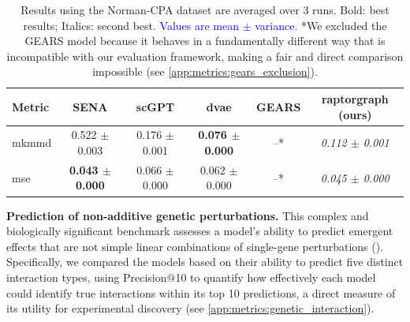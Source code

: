 \documentclass{article}
\begin{document}
\begin{table}[H]
    \centering
    \begin{tabular}{lccccc}
        \toprule
        {Metric} & {SENA} & {scGPT} & {\gls{dvae}} & {GEARS} & {\gls{raptorgraph}} (ours) \\
        \midrule
        \gls{mkmmd} & 0.522 $\pm$ 0.003 & 0.176 $\pm$ 0.001 & \textbf{0.076 $\pm$ 0.000} & {--}* & \textit{0.112 $\pm$ 0.001} \\
        \gls{mse} & \textbf{0.043 $\pm$ 0.000} & 0.066 $\pm$ 0.000 & 0.062 $\pm$ 0.000 & {--}* & \textit{0.045 $\pm$ 0.000} \\
        \bottomrule
    \end{tabular}
    \caption{Results using the Norman-CPA dataset are averaged over $3$ runs. Bold: best results; Italics: second best. \textcolor{blue}{Values are mean $\pm$ variance.}
    *We excluded the GEARS model because it behaves in a fundamentally different way that is incompatible with our evaluation framework, making a fair and direct comparison impossible (see \cref{app:metrics:gears_exclusion}).}
    \label{tab:MMD_results}
\end{table}

\textbf{Prediction of non-additive genetic perturbations.} %
This complex and biologically significant benchmark assesses a model's ability to predict emergent effects that are not simple linear combinations of single-gene perturbations ().
Specifically, we compared the models based on their ability to predict five distinct interaction types, using Precision@10 to quantify how effectively each model could identify true interactions within its top 10 predictions, a direct measure of its utility for experimental discovery (see \cref{app:metrics:genetic_interaction}).


\end{document}
